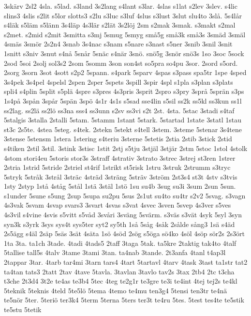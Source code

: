 {3skärv
2sl2
4sla.
s5lad.
s3land
3s2lang
s4lant
s3lar.
4slas
s1lat
s2lev
3slev.
s4lic
slins3
4slis
s2lit
s5lor
slotts3
s2lu
s3luc
s3luf
4slus
s3lust
3slut
slu4to
3slå.
5s4lår
s4läk
s5läm
s5länn
3s4läp
4s3lär
s2lät
3s2löj
2sm
s2mak
3smak.
s3makt
s2mal
s2met.
s2mid
s2mit
3smitta
s3mj
5smug
5smyg
små5g
små3k
små3s
3smäd
3smäl
4smäs
3smör
2s2n4
3snab
3s4nac
s3nam
s5nare
s3nast
s5ner
3snib
3snil
3snit
1snitt
s3niv
3snut
s4nå
5snår
5snäc
s4när
3snö.
snö5g
3snör
snö3s
1so
3soc
5sock
2sod
5soi
2solj
sol3s2
2som
5somm
3son
son4st
so5pra
so4pu
3sor.
2sord
s5ord.
2sorg
3sorn
3sot
4sott
s2p2
5spann.
s4park
5sparv
4spas
s3pass
spa5tr
1spe
4sped
3s4pek
3s4pel
4spelsl
2spen
2sper
5spets
3spill
3spir
4spl
s1pla
s3plan
s3plats
spli4
s4plin
5split
s5plä
4spre
s3pres
4s3pris
3sprit
2spro
s3pry
3språ
5sprän
s3ps
1s4på
3spån
3spår
5spän
3spö
4s1r
4s1s
s5sad
sse4lin
s5sil
ss2k
ss5kl
ss3kun
ss1l
ss2lag.
ss2lä
ss2lö
ss3na
sss4
ss3unn
s2sv
ss3vi
s2t
2st.
4sta.
5stac
3stadi
s4taf
5stalgis
3stalla
2stalli
5stam.
5stamm
1stant
5stark.
5startad
1state
3statl
1stau
st3c
2s5te.
4stea
5steg.
s4tek.
2stekn
5stekt
s4tell
3stem.
3steme
5stenar
3s4tene
3stense
5stensm
1stera
1stering
s4teriu
3sterne
5stetis
2stia
2stib
3stick
2stid
s4tiken
2stil
3stil.
3stink
3stisc
1stit
2stj
s5tju
3stjäl
3stjär
2stm
5stoc
1stol
4stolk
4stom
stori4eu
5storis
stor3s
3straff
4strativ
3strato
3strec
3strej
st3ren
1strer
2stria
1strid
5stride
2striel
st4rif
1strikt
st5risk
1stru
3struk
2strumm
s3tryc
5stryk
5stråk
3strål
3sträc
4sträd
3sträng
5sträv
3ström
2st3s4
st3t
4stv
s3tvis
1sty
2styp
1stå
4ståg
5stål
1stä
3stäl
1stö
1su
su4b
3sug
su3i
3sum
2sun
5sun.
s1under
5sune
s5ung
2sup
5supa
su2pu
5sus
2s1ut
su4to
su4tr
s2v2
5svag.
s3vagn
4s3vak
5svam
4svap
svars3
3svart
4svas
s3vat
4svec
3sven
5svep
4s3ver
s5ves
4s3vil
s4vine
4svis
s5vitt
s5våd
3svåri
3sväng
5svärm.
s3väs
s3vät
4syk
5syl
3syn
syn3k
s3yrk
3sys
sys4t
sys5ter
syt2
sy5th
1så
5såg
4såk
2sålde
sång3
1sä
s4äd
2s5ägg
s4äl
2säp
5säs
3sät
4säta
1sö
4söd
2sög
s5öga
sö4ko
4söl
4söp
sör2s
2s3ört
1ta
3ta.
ta1ch
3tade.
4tadi
4tads5
2taff
3taga
5tak.
ta5kre
2taktig
tak4to
4talf
5tallise
tall5s
4talv
3tame
3tami
3tan.
ta4nab
3tande.
2t3anfa
4tanl
t4ap3l
2tappar
3tar.
4tarb
tar4mi
3tarn
tars4
4tart
5tartavl
4tarv
4task
3tast
ta1str
tat2
ta4tan
tats3
2tatt
2tav
4tave
5tavla.
3tavlan
3tavlo
tav2s
3tax
2tb4
2tc
t3cha
t3che
2t3d4
3t2e
te4as
te3b4
5tec
4teg
te2g1r
te3gre
te3i
te4int
4tej
tej2s
te4kl
5teknik
5teknis
4teld
5te5lö
5tema
4temo
te4mu
ten3g4
5tensi
ten3tr
te4nä
te5nör
5ter.
5teriö
ter3k4
5term
5terna
5ters
ter3t
te4ru
5tes.
5test
tes4te
te5stik
te5stu
5tetik
}
